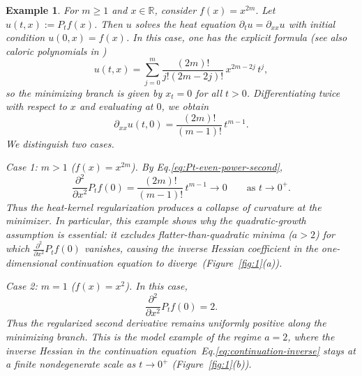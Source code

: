 \documentclass{article}
\newtheorem{example}[example]{Example}
\begin{document}
\begin{example}\label{ex:quadratic} For $m\ge1$ and $x\in\mathbb R$, consider $f(x)=x^{2m}.$ Let $u(t,x):=P_t f(x)$. Then $u$ solves the heat equation $\partial_t u=\partial_{xx}u$ with initial condition $u(0,x)=f(x)$. In this case, one has the explicit formula (see also caloric polynomials in \cite{cannon1984one})
$$u(t,x)
=
\sum_{j=0}^{m}\frac{(2m)!}{j!(2m-2j)!}\,x^{2m-2j}\,t^j,$$
so the minimizing branch is given by 
$x_t=0$ for all $t>0$. Differentiating twice with respect to $x$ and evaluating at $0$, we obtain
\begin{equation}\label{eq:Pt-even-power-second}
\partial_{xx}u(t,0)
=
\frac{(2m)!}{(m-1)!}\,t^{m-1}.
\end{equation}
We distinguish two cases.

\noindent
\emph{Case 1: $m>1$ ($f(x)=x^{2m}$).} By Eq.\eqref{eq:Pt-even-power-second},
$$
\frac{\partial^2}{\partial x^2}P_{t}f(0)=\frac{(2m)!}{(m-1)!}\,t^{m-1}\to0
\qquad\text{as }t\to0^+.
$$
Thus the heat-kernel regularization produces a collapse of curvature at the minimizer. In particular, this example shows why the quadratic-growth assumption is essential: it excludes flatter-than-quadratic minima ($a > 2$) for which $\frac{\partial^2}{\partial x^2}P_{t}f(0)$ vanishes, causing the inverse Hessian coefficient in the one-dimensional continuation equation to diverge~(Figure~\ref{fig:1}(a)).

\noindent
\emph{Case 2: $m=1$ ($f(x)=x^2$).} In this case,
$$
\frac{\partial^2}{\partial x^2}P_{t}f(0)=2.
$$
Thus the regularized second derivative remains uniformly positive along the minimizing branch. This is the model example of the regime $a=2$, where the inverse Hessian in the continuation equation~Eq.\eqref{eq:continuation-inverse} stays at a finite nondegenerate scale as $t\to0^+$ (Figure~\ref{fig:1}(b)).
\end{example}
\end{document}

